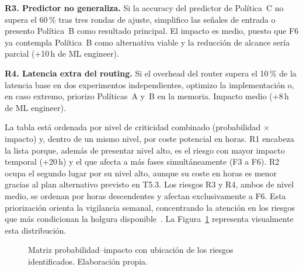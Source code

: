 \documentclass[11pt,a4paper]{article}
\begin{document}
\textbf{R3. Predictor no generaliza.} Si la accuracy del predictor de Política~C no supera el 60\,\% tras tres rondas de ajuste, simplifico las señales de entrada o presento Política~B como resultado principal. El impacto es medio, puesto que F6 ya contempla Política~B como alternativa viable y la reducción de alcance sería parcial (+10\,h de ML engineer).

\textbf{R4. Latencia extra del routing.} Si el overhead del router supera el 10\,\% de la latencia base en dos experimentos independientes, optimizo la implementación o, en caso extremo, priorizo Políticas~A y~B en la memoria. Impacto medio (+8\,h de ML engineer).

La tabla está ordenada por nivel de criticidad combinado (probabilidad $\times$ impacto) y, dentro de un mismo nivel, por coste potencial en horas. R1 encabeza la lista porque, además de presentar nivel alto, es el riesgo con mayor impacto temporal (+20\,h) y el que afecta a más fases simultáneamente (F3 a F6). R2 ocupa el segundo lugar por su nivel alto, aunque su coste en horas es menor gracias al plan alternativo previsto en T5.3. Los riesgos R3 y R4, ambos de nivel medio, se ordenan por horas descendentes y afectan exclusivamente a F6. Esta priorización orienta la vigilancia semanal, concentrando la atención en los riesgos que más condicionan la holgura disponible~\cite{pmbok}. La Figura~\ref{fig:matriz-pi} representa visualmente esta distribución.

\begin{figure}[H]
\centering
{}
\caption{Matriz probabilidad--impacto con ubicación de los riesgos identificados. Elaboración propia.}\label{fig:matriz-pi}
\end{figure}
\end{document}
